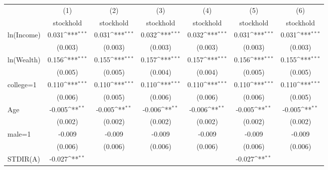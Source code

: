 {
\def\sym#1{\ifmmode^{#1}\else\(^{#1}\)\fi}
\begin{tabular}{l*{6}{c}}
\toprule
                    &\multicolumn{1}{c}{(1)}&\multicolumn{1}{c}{(2)}&\multicolumn{1}{c}{(3)}&\multicolumn{1}{c}{(4)}&\multicolumn{1}{c}{(5)}&\multicolumn{1}{c}{(6)}\\
                    &\multicolumn{1}{c}{stockhold}&\multicolumn{1}{c}{stockhold}&\multicolumn{1}{c}{stockhold}&\multicolumn{1}{c}{stockhold}&\multicolumn{1}{c}{stockhold}&\multicolumn{1}{c}{stockhold}\\
\midrule
ln(Income)          &       0.031\sym{***}&       0.031\sym{***}&       0.032\sym{***}&       0.032\sym{***}&       0.031\sym{***}&       0.031\sym{***}\\
                    &     (0.003)         &     (0.003)         &     (0.003)         &     (0.003)         &     (0.003)         &     (0.003)         \\
\addlinespace
ln(Wealth)          &       0.156\sym{***}&       0.155\sym{***}&       0.157\sym{***}&       0.157\sym{***}&       0.156\sym{***}&       0.155\sym{***}\\
                    &     (0.005)         &     (0.005)         &     (0.004)         &     (0.004)         &     (0.005)         &     (0.005)         \\
\addlinespace
college=1           &       0.110\sym{***}&       0.110\sym{***}&       0.110\sym{***}&       0.110\sym{***}&       0.110\sym{***}&       0.110\sym{***}\\
                    &     (0.006)         &     (0.005)         &     (0.006)         &     (0.006)         &     (0.006)         &     (0.005)         \\
\addlinespace
Age                 &      -0.005\sym{**} &      -0.005\sym{**} &      -0.006\sym{**} &      -0.006\sym{**} &      -0.005\sym{**} &      -0.005\sym{**} \\
                    &     (0.002)         &     (0.002)         &     (0.002)         &     (0.002)         &     (0.002)         &     (0.002)         \\
\addlinespace
male=1              &      -0.009         &      -0.009         &      -0.009         &      -0.009         &      -0.009         &      -0.009         \\
                    &     (0.006)         &     (0.006)         &     (0.006)         &     (0.006)         &     (0.006)         &     (0.006)         \\
\addlinespace
STDIR(A)            &      -0.027\sym{**} &                     &                     &                     &      -0.027\sym{**} &                     \\

\end{tabular}}
